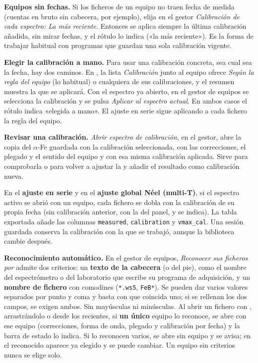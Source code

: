 \textbf{Equipos sin fechas.} Si los ficheros de un equipo no traen fecha de medida
(cuentas en bruto sin cabecera, por ejemplo), elija en el gestor \emph{Calibración
de cada espectro: La más reciente}. Entonces se aplica siempre la última calibración
añadida, sin mirar fechas, y el rótulo lo indica («la más reciente»). Es la forma
de trabajar habitual con programas que guardan una sola calibración vigente.

\textbf{Elegir la calibración a mano.} Para usar una calibración concreta, sea cual
sea la fecha, hay dos caminos. En , la lista \emph{Calibración}
junto al equipo ofrece \emph{Según la regla del equipo} (lo habitual) o cualquiera
de sus calibraciones, y el resumen muestra la  que se aplicará. Con
el espectro ya abierto, en el gestor de equipos se selecciona la calibración y se
pulsa \emph{Aplicar al espectro actual}. En ambos casos el rótulo indica
«elegida a mano». El ajuste en serie sigue aplicando a cada fichero la regla del
equipo.

\textbf{Revisar una calibración.} \emph{Abrir espectro de calibración}, en el
gestor, abre la copia del $\alpha$-Fe guardada con la calibración seleccionada,
con las correcciones, el plegado y el sentido del equipo y con esa misma
calibración aplicada. Sirve para comprobarla o para volver a ajustar la
 y añadir el resultado como calibración nueva.

En el \textbf{ajuste en serie} y en el \textbf{ajuste global Néel (multi-T)}, si
el espectro activo se abrió con un equipo, cada fichero se dobla con la
calibración de su propia fecha (sin calibración anterior, con la 
del panel, y se indica). La tabla exportada añade las columnas \texttt{measured}, \texttt{calibration} y \texttt{vmax\_cal}.
Una sesión guardada conserva la calibración con la que se trabajó, aunque la
biblioteca cambie después.

\textbf{Reconocimiento automático.} En el gestor de equipos, \emph{Reconocer sus
ficheros por} admite dos criterios: un \textbf{texto de la cabecera} (o del pie),
como el nombre del espectrómetro o del laboratorio que escribe su programa de
adquisición, y un \textbf{nombre de fichero} con comodines (\texttt{*.ws5},
\texttt{FeB*}). Se pueden dar varios valores separados por punto y coma y basta
con que coincida uno; si se rellenan los dos campos, se exigen ambos. Sin mayúsculas
ni minúsculas. Al abrir un fichero con , arrastrándolo o desde los
recientes, si \textbf{un único} equipo lo reconoce, se abre con ese equipo
(correcciones, forma de onda, plegado y calibración por fecha) y la barra de estado
lo indica. Si lo reconocen varios, se abre sin equipo y se avisa; en
 el reconocido aparece ya elegido y se puede cambiar. Un equipo
sin criterios nunca se elige solo.

